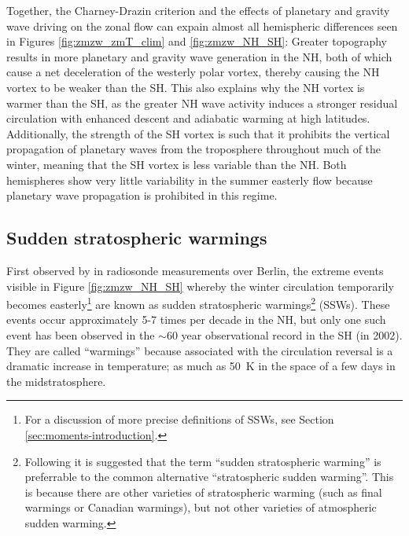 \bigskip Together, the Charney-Drazin criterion and the effects of planetary and
gravity wave driving on the zonal flow can expain almost all hemispheric
differences seen in Figures \ref{fig:zmzw_zmT_clim} and \ref{fig:zmzw_NH_SH}:
Greater topography results in more planetary and gravity wave generation in the
NH, both of which cause a net deceleration of the westerly polar vortex, thereby
causing the NH vortex to be weaker than the SH. This also explains why the NH
vortex is warmer than the SH, as the greater NH wave activity induces a stronger
residual circulation with enhanced descent and adiabatic warming at high
latitudes. Additionally, the strength of the SH vortex is such that it prohibits
the vertical propagation of planetary waves from the troposphere throughout much
of the winter, meaning that the SH vortex is less variable than the NH. Both
hemispheres show very little variability in the summer easterly flow because
planetary wave propagation is prohibited in this regime.


\subsection{Sudden stratospheric warmings}
\label{sec:strat-sudd-warm}
First observed by \citet{Scherhag1952} in radiosonde measurements over Berlin,
the extreme events visible in Figure \ref{fig:zmzw_NH_SH} whereby the winter
circulation temporarily becomes easterly\footnote{For a discussion of more
  precise definitions of SSWs, see Section \ref{sec:moments-introduction}.} are
known as sudden stratospheric warmings\footnote{Following \citet{Butler2014a} it
  is suggested that the term ``sudden stratospheric warming'' is preferrable to
  the common alternative ``stratospheric sudden warming''. This is because there
  are other varieties of stratospheric warming (such as final warmings or
  Canadian warmings), but not other varieties of atmospheric sudden warming.}
(SSWs). These events occur approximately 5-7 times per decade in the NH, but
only one such event has been observed in the $\sim 60$ year observational record
in the SH (in 2002). They are called ``warmings'' because associated with the
circulation reversal is a dramatic increase in temperature; as much as 50~K in
the space of a few days in the midstratosphere.

